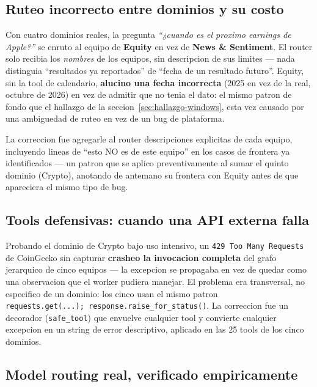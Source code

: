 \documentclass[11pt]{article}
\begin{document}
\subsection{Ruteo incorrecto entre dominios y su costo}

Con cuatro dominios reales, la pregunta \emph{``¿cuando es el proximo
earnings de Apple?''} se enruto al equipo de \textbf{Equity} en vez de
\textbf{News \& Sentiment}. El router solo recibia los \emph{nombres} de los
equipos, sin descripcion de sus limites --- nada distinguia ``resultados ya
reportados'' de ``fecha de un resultado futuro''. Equity, sin la tool de
calendario, \textbf{alucino una fecha incorrecta} (2025 en vez de la real,
octubre de 2026) en vez de admitir que no tenia el dato: el mismo patron de
fondo que el hallazgo de la seccion~\ref{sec:hallazgo-windows}, esta vez
causado por una ambiguedad de ruteo en vez de un bug de plataforma.

La correccion fue agregarle al router descripciones explicitas de cada
equipo, incluyendo lineas de ``esto NO es de este equipo'' en los casos de
frontera ya identificados --- un patron que se aplico preventivamente al
sumar el quinto dominio (Crypto), anotando de antemano su frontera con
Equity antes de que apareciera el mismo tipo de bug.

\subsection{Tools defensivas: cuando una API externa falla}

Probando el dominio de Crypto bajo uso intensivo, un \texttt{429 Too Many
Requests} de CoinGecko sin capturar \textbf{crasheo la invocacion completa}
del grafo jerarquico de cinco equipos --- la excepcion se propagaba en vez de
quedar como una observacion que el worker pudiera manejar. El problema era
transversal, no especifico de un dominio: los cinco usan el mismo patron
\texttt{requests.get(...);\ response.raise\_for\_status()}. La correccion fue
un decorador (\texttt{safe\_tool}) que envuelve cualquier tool y convierte
cualquier excepcion en un string de error descriptivo, aplicado en las 25
tools de los cinco dominios.

\subsection{Model routing real, verificado empiricamente}
\end{document}
